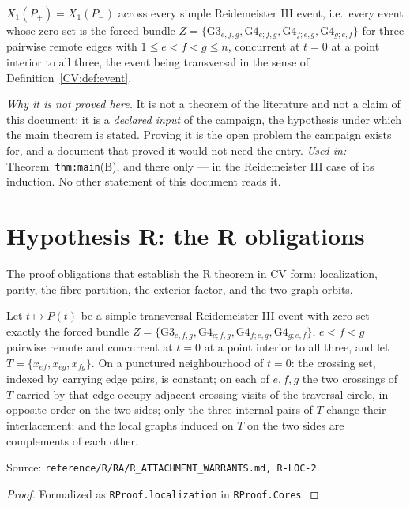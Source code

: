 \begin{hypothesis}\label{CV:ax:R}\leanok{}
$X_1(P_+)=X_1(P_-)$ across every simple Reidemeister III event, i.e.\ every
event whose zero set is the forced bundle
$Z=\{\mathrm{G3}_{e,f,g},\mathrm{G4}_{e;f,g},\mathrm{G4}_{f;e,g},
\mathrm{G4}_{g;e,f}\}$ for three pairwise remote edges with
$1\leq e<f<g\leq n$, concurrent at $t=0$ at a point interior to all three, the
event being transversal in the sense of Definition~\ref{CV:def:event}.

\emph{Why it is not proved here.} It is not a theorem of the literature and not
a claim of this document: it is a \emph{declared input} of the campaign, the
hypothesis under which the main theorem is stated. Proving it is the open
problem the campaign exists for, and a document that proved it would not need
the entry.
\emph{Used in:} Theorem~\texttt{thm:main}(B), and there only --- in the Reidemeister
III case of its induction. No other statement of this document reads it.
\end{hypothesis}

\chapter{Hypothesis R: the R obligations}
The proof obligations that establish the R theorem in CV form: localization, parity, the fibre partition, the exterior factor, and the two graph orbits.

\begin{obligation}\label{R:localization}\leanok
Let $t\mapsto P(t)$ be a simple transversal Reidemeister-III event with zero set exactly the forced bundle
$Z=\{\mathrm{G3}_{e,f,g},\mathrm{G4}_{e;f,g},\mathrm{G4}_{f;e,g},\mathrm{G4}_{g;e,f}\}$, $e<f<g$ pairwise remote and
concurrent at $t=0$ at a point interior to all three, and let $T=\{x_{ef},x_{eg},x_{fg}\}$. On a punctured
neighbourhood of $t=0$: the crossing set, indexed by carrying edge pairs, is constant; on each of $e,f,g$ the two
crossings of $T$ carried by that edge occupy adjacent crossing-visits of the traversal circle, in opposite order on the
two sides; only the three internal pairs of $T$ change their interlacement; and the local graphs induced on $T$ on the two
sides are complements of each other.

Source: \texttt{reference/R/RA/R\_ATTACHMENT\_WARRANTS.md, R-LOC-2}.
\end{obligation}
\begin{proof}\leanok{}
Formalized as \texttt{RProof.localization} in \texttt{RProof.Cores}.
\end{proof}

